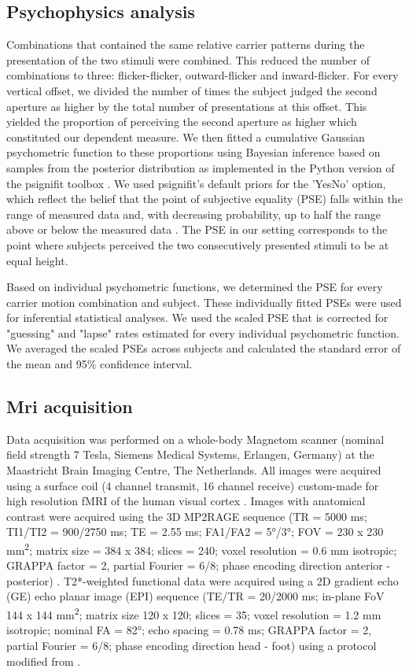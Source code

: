 \subsection{Psychophysics analysis}
Combinations that contained the same relative carrier patterns during the presentation of the two stimuli were combined. This reduced the number of combinations to three: flicker-flicker, outward-flicker and inward-flicker. For every vertical offset, we divided the number of times the subject judged the second aperture as higher by the total number of presentations at this offset. This yielded the proportion of perceiving the second aperture as higher which constituted our dependent measure. We then fitted a cumulative Gaussian psychometric function to these proportions using Bayesian inference based on samples from the posterior distribution as implemented in the Python version of the psignifit toolbox \parencite{Frund2011}. We used psignifit's default priors for the 'YesNo' option, which reflect the belief that the point of subjective equality (PSE) falls within the range of measured data and, with decreasing probability, up to half the range above or below the measured data \parencite{Frund2011}. The PSE in our setting corresponds to the point where subjects perceived the two consecutively presented stimuli to be at equal height.

Based on individual psychometric functions, we determined the PSE for every carrier motion combination and subject. These individually fitted PSEs were used for inferential statistical analyses. We used the scaled PSE that is corrected for "guessing" and "lapse" rates estimated for every individual psychometric function. We averaged the scaled PSEs across subjects and calculated the standard error of the mean and 95\% confidence interval.

\subsection{Mri acquisition}
Data acquisition was performed on a whole-body Magnetom scanner (nominal field strength 7 Tesla, Siemens Medical Systems, Erlangen, Germany) at the Maastricht Brain Imaging Centre, The Netherlands. All images were acquired using a surface coil (4 channel transmit, 16 channel receive) custom-made for high resolution fMRI of the human visual cortex \parencite{Sengupta2016}. Images with anatomical contrast were acquired using the 3D MP2RAGE sequence (TR = 5000 ms; TI1/TI2 = 900/2750 ms; TE = 2.55 ms; FA1/FA2 = 5°/3°; FOV = 230 x 230 mm\textsuperscript{2}; matrix size = 384 x 384; slices = 240; voxel resolution = 0.6 mm isotropic; GRAPPA factor = 2, partial Fourier = 6/8; phase encoding direction anterior - posterior) \parencite{Marques2010}. T2*-weighted functional data were acquired using a 2D gradient echo (GE) echo planar image (EPI) sequence (TE/TR = 20/2000 ms; in-plane FoV 144 x 144 mm\textsuperscript{2}; matrix size 120 x 120; slices = 35; voxel resolution = 1.2 mm isotropic; nominal FA = 82°; echo spacing = 0.78 ms; GRAPPA factor = 2, partial Fourier = 6/8; phase encoding direction head - foot) using a protocol modified from \cite{Feinberg2010, Setsompop2012, Moeller2010}.

